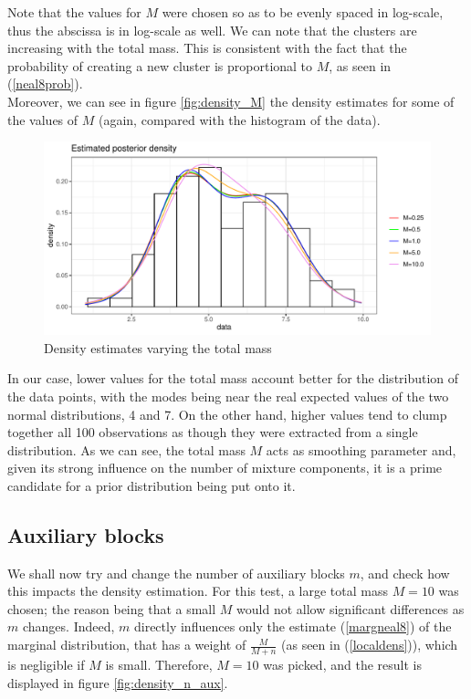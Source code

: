 Note that the values for $M$ were chosen so as to be evenly spaced in log-scale, thus the abscissa is in log-scale as well.
We can note that the clusters are increasing with the total mass.
This is consistent with the fact that the probability of creating a new cluster is proportional to $M$, as seen in (\ref{neal8prob}). \\
Moreover, we can see in figure \ref{fig:density_M} the density estimates for some of the values of $M$ (again, compared with the histogram of the data).

\clearpage

\begin{figure}[h]
	\centering
	\includegraphics[scale=0.55]{etc/dens_withMm3.pdf}
	\caption{Density estimates varying the total mass}

	\label{fig:density_total_mass}
\end{figure}


In our case, lower values for the total mass account better for the distribution of the data points, with the modes being near the real expected values of the two normal distributions, 4 and 7.
On the other hand, higher values tend to clump together all 100 observations as though they were extracted from a single distribution.
As we can see, the total mass $M$ acts as smoothing parameter and, given its strong influence on the number of mixture components, it is a prime candidate for a prior distribution being put onto it.



\subsection{Auxiliary blocks}
We shall now try and change the number of auxiliary blocks $m$, and check how this impacts the density estimation.
For this test, a large total mass $M=10$ was chosen; the reason being that a small $M$ would not allow significant differences as $m$ changes.
Indeed, $m$ directly influences only the estimate (\ref{margneal8}) of the marginal distribution, that has a weight of $\frac{M}{M+n}$ (as seen in (\ref{localdens})), which is negligible if $M$ is small.
Therefore, $M=10$ was picked, and the result is displayed in figure \ref{fig:density_n_aux}.


